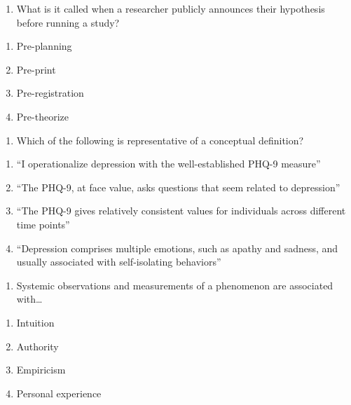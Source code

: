 \documentclass[
  12pt,
  letterpaper,
  DIV=11,
  numbers=noendperiod]{scrartcl}
\providecommand{\tightlist}{%
  \setlength{\itemsep}{0pt}\setlength{\parskip}{0pt}}\usepackage{longtable,booktabs,array}
\begin{document}
\begin{enumerate}
\def\labelenumi{\arabic{enumi}.}
\setcounter{enumi}{17}
\tightlist
\item
  What is it called when a researcher publicly announces their
  hypothesis before running a study?
\end{enumerate}

\begin{enumerate}
\def\labelenumi{\alph{enumi}.}
\tightlist
\item
  Pre-planning
\item
  Pre-print
\item
  Pre-registration
\item
  Pre-theorize
\end{enumerate}

\begin{enumerate}
\def\labelenumi{\arabic{enumi}.}
\setcounter{enumi}{18}
\tightlist
\item
  Which of the following is representative of a conceptual definition?
\end{enumerate}

\begin{enumerate}
\def\labelenumi{\alph{enumi}.}
\tightlist
\item
  ``I operationalize depression with the well-established PHQ-9
  measure''
\item
  ``The PHQ-9, at face value, asks questions that seem related to
  depression''
\item
  ``The PHQ-9 gives relatively consistent values for individuals across
  different time points''
\item
  ``Depression comprises multiple emotions, such as apathy and sadness,
  and usually associated with self-isolating behaviors''
\end{enumerate}

\begin{enumerate}
\def\labelenumi{\arabic{enumi}.}
\setcounter{enumi}{19}
\tightlist
\item
  Systemic observations and measurements of a phenomenon are associated
  with\ldots{}
\end{enumerate}

\begin{enumerate}
\def\labelenumi{\alph{enumi}.}
\tightlist
\item
  Intuition
\item
  Authority
\item
  Empiricism
\item
  Personal experience
\end{enumerate}
\end{document}
